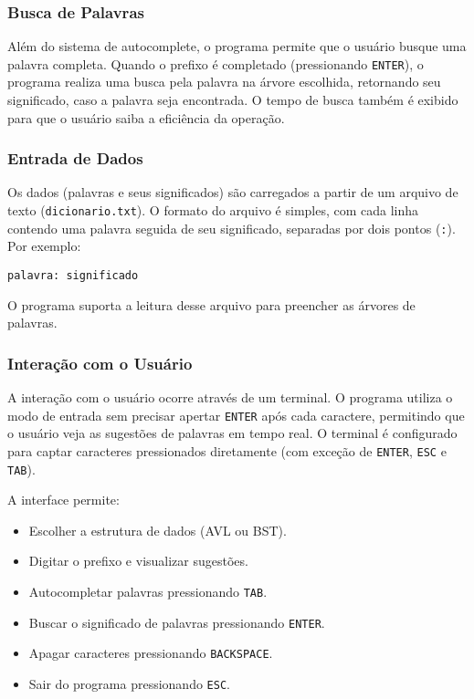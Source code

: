 \documentclass{article}
\begin{document}
\subsubsection{Busca de Palavras}
Além do sistema de autocomplete, o programa permite que o usuário busque uma palavra completa. Quando o prefixo é completado (pressionando \texttt{ENTER}), o programa realiza uma busca pela palavra na árvore escolhida, retornando seu significado, caso a palavra seja encontrada. O tempo de busca também é exibido para que o usuário saiba a eficiência da operação.

\subsubsection{Entrada de Dados}
Os dados (palavras e seus significados) são carregados a partir de um arquivo de texto (\texttt{dicionario.txt}). O formato do arquivo é simples, com cada linha contendo uma palavra seguida de seu significado, separadas por dois pontos (\texttt{:}). Por exemplo:
\begin{verbatim}
palavra: significado
\end{verbatim}

O programa suporta a leitura desse arquivo para preencher as árvores de palavras.

\subsubsection{Interação com o Usuário}
A interação com o usuário ocorre através de um terminal. O programa utiliza o modo de entrada sem precisar apertar \texttt{ENTER} após cada caractere, permitindo que o usuário veja as sugestões de palavras em tempo real. O terminal é configurado para captar caracteres pressionados diretamente (com exceção de \texttt{ENTER}, \texttt{ESC} e \texttt{TAB}).

A interface permite:
\begin{itemize}
    \item Escolher a estrutura de dados (AVL ou BST).
    \item Digitar o prefixo e visualizar sugestões.
    \item Autocompletar palavras pressionando \texttt{TAB}.
    \item Buscar o significado de palavras pressionando \texttt{ENTER}.
    \item Apagar caracteres pressionando \texttt{BACKSPACE}.
    \item Sair do programa pressionando \texttt{ESC}.
\end{itemize}
\end{document}
